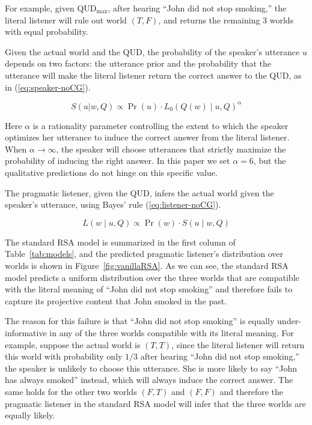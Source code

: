 For example, given QUD$_\textrm{max}$, after hearing
 ``John did not stop smoking,'' the literal listener will rule out world
 $(T, F)$, and returns the remaining 3 worlds with equal probability.


Given the actual world and the QUD, the probability of 
 the speaker's utterance $u$ depends on two factors: the utterance prior 
 and the probability that the utterance will make the literal listener 
 return the correct answer to the QUD, as in (\ref{eq:speaker-noCG}).
 
\begin{equation}
S(u | w, Q) \propto \Pr(u) \cdot L_0(Q(w) \mid u, Q)^\alpha 
\label{eq:speaker-noCG}
\end{equation}

Here $\alpha$ is a rationality parameter controlling the extent to which 
 the speaker optimizes her utterance to induce the correct answer from the 
 literal listener. 
When $\alpha \rightarrow \infty$, the speaker will choose utterances that 
 strictly maximize the probability of inducing the right answer.
In this paper we set $\alpha=6$, but the qualitative predictions do not hinge on 
 this specific value.

The pragmatic listener, given the QUD, infers the actual world given the speaker's utterance, using Bayes' rule (\ref{eq:listener-noCG}).

\begin{equation}
L(w \mid u, Q) \propto \Pr(w) \cdot S(u \mid w, Q) \label{eq:listener-noCG}
\end{equation}

The standard RSA model is summarized in the first column of Table~\ref{tab:models},
 and the predicted pragmatic listener's distribution over worlds is shown in Figure~\ref{fig:vanillaRSA}.
As we can see, the standard RSA model predicts a uniform distribution over the
 three worlds that are compatible with the literal meaning of 
 ``John did not stop smoking'' and therefore fails to capture its projective content
 that John smoked in the past.

The reason for this failure is that ``John did not stop smoking'' is equally
 under-informative in any of the three worlds compatible with its literal meaning.
For example, suppose the actual world is $(T, T)$, since the 
 literal listener will return this world with probability only $1/3$ after hearing ``John did not stop smoking,'' the speaker is unlikely to choose this utterance.
She is more likely to say ``John has always smoked'' instead, which will always
 induce the correct answer. 
The same holds for the other two worlds $(F, T)$ and $(F,
 F)$ and therefore the pragmatic listener in the standard RSA model will 
 infer that the three worlds are equally likely.
 
